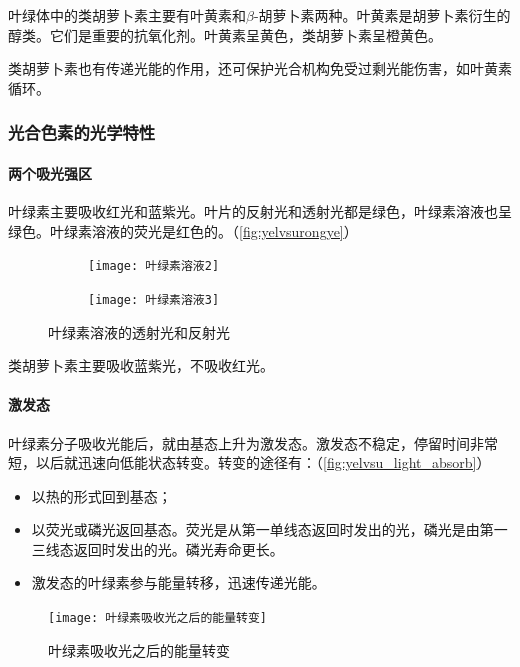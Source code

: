 叶绿体中的类胡萝卜素主要有叶黄素和$\beta$-胡萝卜素两种。叶黄素是胡萝卜素衍生的醇类。它们是重要的抗氧化剂。叶黄素呈黄色，类胡萝卜素呈橙黄色。

类胡萝卜素也有传递光能的作用，还可保护光合机构免受过剩光能伤害，如叶黄素循环。

\subsubsection{光合色素的光学特性}

\paragraph{两个吸光强区}

叶绿素主要吸收红光和蓝紫光。叶片的反射光和透射光都是绿色，叶绿素溶液也呈绿色。叶绿素溶液的荧光是红色的。（\autoref{fig:yelvsurongye}）

\begin{figure}[htbp]
	\centering
	\begin{subfigure}{0.45\textwidth}
		\texttt{[image: 叶绿素溶液2]}
	\end{subfigure}
	\hfill
	\begin{subfigure}{0.45\textwidth}
		\texttt{[image: 叶绿素溶液3]}
	\end{subfigure}
	\caption{叶绿素溶液的透射光和反射光}
	\label{fig:yelvsurongye}
\end{figure}


类胡萝卜素主要吸收蓝紫光，不吸收红光。

\paragraph{激发态}

叶绿素分子吸收光能后，就由基态上升为激发态。激发态不稳定，停留时间非常短，以后就迅速向低能状态转变。转变的途径有：（\autoref{fig:yelvsu_light_absorb}）
\begin{itemize}
	\item 以热的形式回到基态；
	\item 以荧光或磷光返回基态。荧光是从第一单线态返回时发出的光，磷光是由第一三线态返回时发出的光。磷光寿命更长。
	\item 激发态的叶绿素参与能量转移，迅速传递光能。
\end{itemize}

\begin{figure}[htbp]
	\centering
	\texttt{[image: 叶绿素吸收光之后的能量转变]}
	\caption{叶绿素吸收光之后的能量转变}
	\label{fig:yelvsu_light_absorb}
\end{figure}


